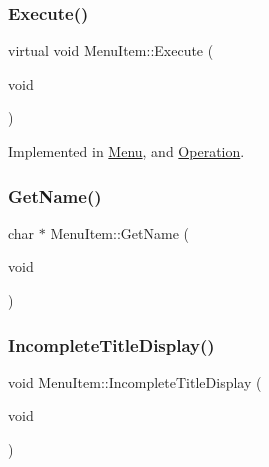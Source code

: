 \mbox{\label{class_menu_item_a08f0695dbfdad36bc9aab7597df02a00}} 
\subsubsection{\texorpdfstring{Execute()}{Execute()}}
{\footnotesize\ttfamily virtual void Menu\+Item\+::\+Execute (\begin{DoxyParamCaption}\item[{void}]{ }\end{DoxyParamCaption})\hspace{0.3cm}{\ttfamily [pure virtual]}}



Implemented in \hyperlink{class_menu_a0be077217ae2c0735bd148e8359be21b}{Menu}, and \hyperlink{class_operation_a669c894cc03d476fd8acecbf880dd606}{Operation}.

\mbox{\label{class_menu_item_af23de886a192dede54b3254db5aa1830}} 
\subsubsection{\texorpdfstring{Get\+Name()}{GetName()}}
{\footnotesize\ttfamily char $\ast$ Menu\+Item\+::\+Get\+Name (\begin{DoxyParamCaption}\item[{void}]{ }\end{DoxyParamCaption})}

\mbox{\label{class_menu_item_aebc0f7620d970a978a24628adbfbe955}} 
\subsubsection{\texorpdfstring{Incomplete\+Title\+Display()}{IncompleteTitleDisplay()}}
{\footnotesize\ttfamily void Menu\+Item\+::\+Incomplete\+Title\+Display (\begin{DoxyParamCaption}\item[{void}]{ }\end{DoxyParamCaption})\hspace{0.3cm}{\ttfamily [protected]}}



